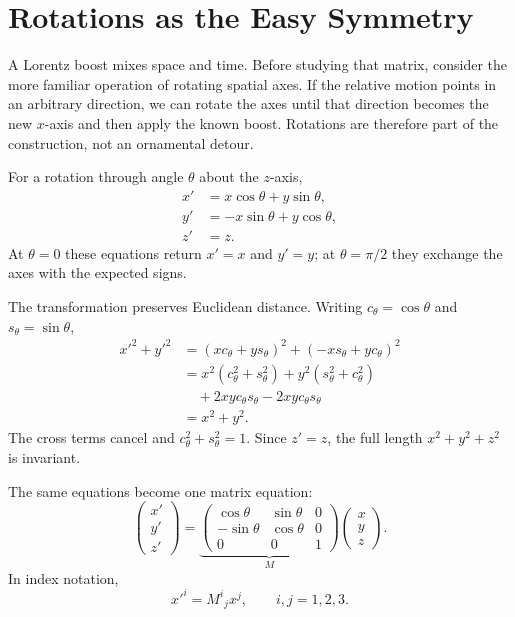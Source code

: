 \begin{classroomqa}
\end{classroomqa}

\section{Rotations as the Easy Symmetry}

A Lorentz boost mixes space and time. Before studying that matrix, consider
the more familiar operation of rotating spatial axes. If the relative motion
points in an arbitrary direction, we can rotate the axes until that direction
becomes the new \(x\)-axis and then apply the known boost. Rotations are
therefore part of the construction, not an ornamental detour.

For a rotation through angle \(\theta\) about the \(z\)-axis,
\begin{align}
x'&=x\cos\theta+y\sin\theta,\nonumber\\
y'&=-x\sin\theta+y\cos\theta,\label{eq:l5-rotation}\\
z'&=z.\nonumber
\end{align}
At \(\theta=0\) these equations return \(x'=x\) and \(y'=y\); at
\(\theta=\pi/2\) they exchange the axes with the expected signs.

The transformation preserves Euclidean distance. Writing
\(c_\theta=\cos\theta\) and \(s_\theta=\sin\theta\),
\begin{align}
x'^2+y'^2
&=(xc_\theta+ys_\theta)^2+(-xs_\theta+yc_\theta)^2\nonumber\\
&=x^2(c_\theta^2+s_\theta^2)
  +y^2(s_\theta^2+c_\theta^2)\nonumber\\
&\quad+2xyc_\theta s_\theta-2xyc_\theta s_\theta\nonumber\\
&=x^2+y^2.
\end{align}
The cross terms cancel and \(c_\theta^2+s_\theta^2=1\). Since \(z'=z\),
the full length \(x^2+y^2+z^2\) is invariant.

The same equations become one matrix equation:
\begin{equation}
\begin{pmatrix}x'\\y'\\z'\end{pmatrix}
=
\underbrace{\begin{pmatrix}
\cos\theta&\sin\theta&0\\
-\sin\theta&\cos\theta&0\\
0&0&1
\end{pmatrix}}_{M}
\begin{pmatrix}x\\y\\z\end{pmatrix}.
\label{eq:l5-rotation-matrix}
\end{equation}
In index notation,
\begin{equation}
x'^i=M^i{}_{j}x^j,
\qquad i,j=1,2,3.
\end{equation}

